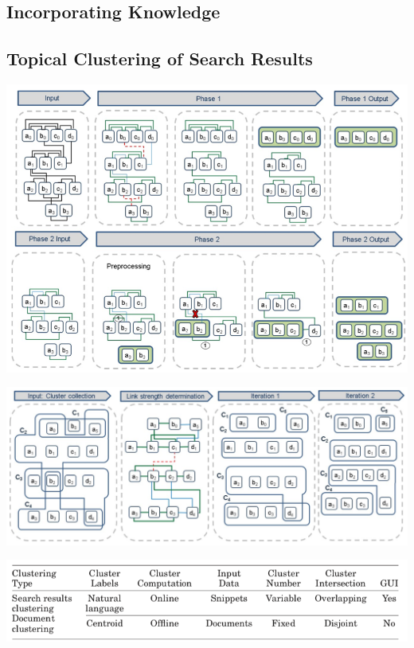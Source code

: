 \documentclass[runningheads]{llncs}
\begin{document}
\subsection{Incorporating Knowledge }


\subsection{Topical Clustering of Search Results}
\cite{Scaiella}


\begin{center}
\includegraphics[width=1\textwidth]{clip_example.png}
\end{center}

\begin{center}
\includegraphics[width=1\textwidth]{clip_overlap_resolution.png}
\end{center}

\begin{center}
\includegraphics[width=1\textwidth]{traditional_vs_web.png}
\end{center}
\end{document}
